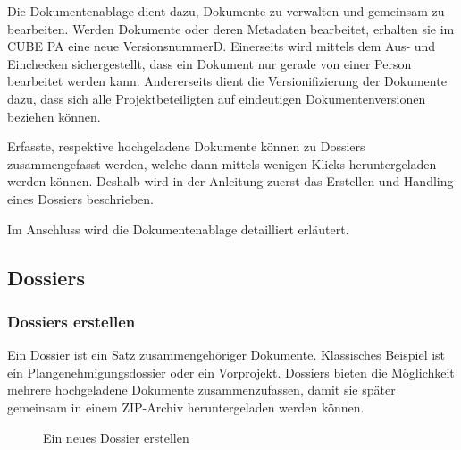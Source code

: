 \vspace{\baselineskip}

Die Dokumentenablage dient dazu, Dokumente zu verwalten und gemeinsam zu bearbeiten. Werden Dokumente oder deren Metadaten bearbeitet, erhalten sie im CUBE PA eine neue VersionsnummerD. Einerseits wird mittels dem Aus- und Einchecken sichergestellt, dass ein Dokument nur gerade von einer Person bearbeitet werden kann. Andererseits dient die Versionifizierung der Dokumente dazu, dass sich alle Projektbeteiligten auf eindeutigen Dokumentenversionen beziehen können. 

\vspace{1cm}  

Erfasste, respektive hochgeladene Dokumente können zu Dossiers zusammengefasst werden, welche dann mittels wenigen Klicks heruntergeladen werden können. Deshalb wird in der Anleitung zuerst das Erstellen und Handling eines Dossiers beschrieben.

\vspace{\baselineskip}

Im Anschluss wird die Dokumentenablage detailliert erläutert.

\subsection{Dossiers}
\label{bkm:Ref442544219}
\subsubsection{Dossiers erstellen}

Ein Dossier ist ein Satz zusammengehöriger Dokumente. Klassisches Beispiel ist ein Plangenehmigungsdossier oder ein Vorprojekt. Dossiers bieten die Möglichkeit mehrere hochgeladene Dokumente zusammenzufassen, damit sie später gemeinsam in einem ZIP-Archiv heruntergeladen werden können.

\begin{figure}[H]
\caption{Ein neues Dossier erstellen}
\end{figure}

